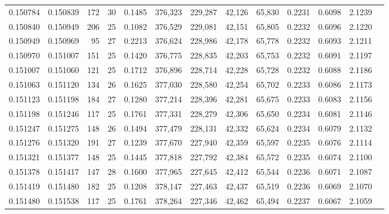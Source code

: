 \begin{tabular}{rrrrrrrrrrrrr}
0.150784 & 0.150839 & 172 &  30 &                                     0.1485 & 376,323 & 229,287 &  42,126 &  65,830 & 0.2231 & 0.6098 & 2.1239 \\
0.150840 & 0.150949 & 206 &  25 &                                     0.1082 & 376,529 & 229,081 &  42,151 &  65,805 & 0.2232 & 0.6096 & 2.1220 \\
0.150949 & 0.150969 &  95 &  27 &                                     0.2213 & 376,624 & 228,986 &  42,178 &  65,778 & 0.2232 & 0.6093 & 2.1211 \\
0.150970 & 0.151007 & 151 &  25 &                                     0.1420 & 376,775 & 228,835 &  42,203 &  65,753 & 0.2232 & 0.6091 & 2.1197 \\
0.151007 & 0.151060 & 121 &  25 &                                     0.1712 & 376,896 & 228,714 &  42,228 &  65,728 & 0.2232 & 0.6088 & 2.1186 \\
0.151063 & 0.151120 & 134 &  26 &                                     0.1625 & 377,030 & 228,580 &  42,254 &  65,702 & 0.2233 & 0.6086 & 2.1173 \\
0.151123 & 0.151198 & 184 &  27 &                                     0.1280 & 377,214 & 228,396 &  42,281 &  65,675 & 0.2233 & 0.6083 & 2.1156 \\
0.151198 & 0.151246 & 117 &  25 &                                     0.1761 & 377,331 & 228,279 &  42,306 &  65,650 & 0.2234 & 0.6081 & 2.1146 \\
0.151247 & 0.151275 & 148 &  26 &                                     0.1494 & 377,479 & 228,131 &  42,332 &  65,624 & 0.2234 & 0.6079 & 2.1132 \\
0.151276 & 0.151320 & 191 &  27 &                                     0.1239 & 377,670 & 227,940 &  42,359 &  65,597 & 0.2235 & 0.6076 & 2.1114 \\
0.151321 & 0.151377 & 148 &  25 &                                     0.1445 & 377,818 & 227,792 &  42,384 &  65,572 & 0.2235 & 0.6074 & 2.1100 \\
0.151378 & 0.151417 & 147 &  28 &                                     0.1600 & 377,965 & 227,645 &  42,412 &  65,544 & 0.2236 & 0.6071 & 2.1087 \\
0.151419 & 0.151480 & 182 &  25 &                                     0.1208 & 378,147 & 227,463 &  42,437 &  65,519 & 0.2236 & 0.6069 & 2.1070 \\
0.151480 & 0.151538 & 117 &  25 &                                     0.1761 & 378,264 & 227,346 &  42,462 &  65,494 & 0.2237 & 0.6067 & 2.1059 \\

\end{tabular}
